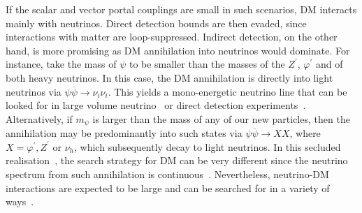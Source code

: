 If the scalar and vector portal couplings are small in such scenarios, DM interacts mainly with neutrinos. Direct detection bounds are then evaded, since interactions with matter are loop-suppressed. Indirect detection, on the other hand, is more promising as DM annihilation into neutrinos would dominate. For instance, take the mass of $\psi$ to be smaller than the masses of the $Z^\prime$, $\varphi^\prime$ and of both heavy neutrinos. In this case, the DM annihilation is directly into light neutrinos via $\psi \overline{\psi} \to \nu_i \nu_i$. This yields a mono-energetic neutrino line that can be looked for in large volume neutrino~\cite{Beacom:2006tt,PalomaresRuiz:2007eu} or direct detection experiments~\cite{McKeen:2018pbb}. Alternatively, if $m_\psi$ is larger than the mass of any of our new particles, then the annihilation may be predominantly into such states via $\psi \overline{\psi} \to X X$, where $X=\varphi^\prime, Z^\prime$ or $\nu_h$, which subsequently decay to light neutrinos. In this secluded realisation~\cite{Pospelov:2007mp}, the search strategy for DM can be very different since the neutrino spectrum from such annihilation is continuous~\cite{Escudero:2016ksa}. Nevertheless, neutrino-DM interactions are expected to be large and can be searched for in a variety of ways~\cite{Mangano:2006mp,Wilkinson:2014ksa,Farzan:2014gza,Campo:2017nwh,Arguelles:2017atb}.



